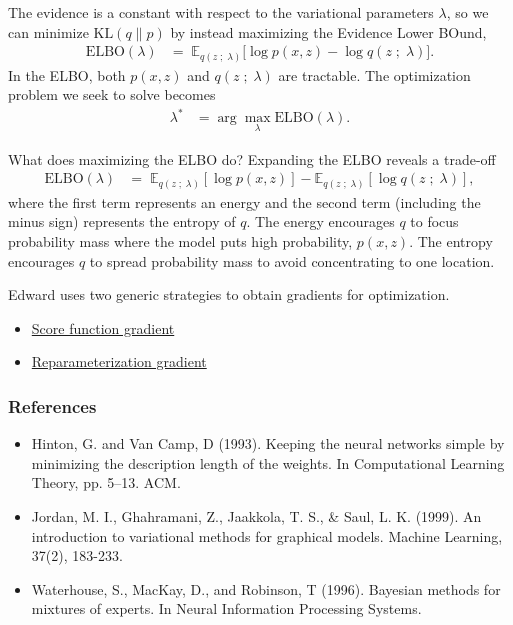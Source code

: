 The evidence is a constant with respect to the variational parameters $\lambda$,
so we can minimize $\text{KL}(q\|p)$ by instead maximizing
the Evidence Lower BOund,
\begin{align*}
  \text{ELBO}(\lambda)
  &=\;
  \mathbb{E}_{q(z\;;\;\lambda)}
  \big[
  \log p(x, z)
  -
  \log q(z\;;\;\lambda)
  \big].
\end{align*}
In the ELBO, both $p(x,z)$ and $q(z\;;\;\lambda)$ are
tractable. The optimization problem we seek to solve becomes
\begin{align*}
  \lambda^*
  &=
  \arg \max_\lambda \text{ELBO}(\lambda).
\end{align*}

What does maximizing the ELBO do? Expanding the ELBO reveals a trade-off
\begin{align*}
  \text{ELBO}(\lambda)
  &=\;
  \mathbb{E}_{q(z \;;\; \lambda)}[\log p(x, z)]
  - \mathbb{E}_{q(z \;;\; \lambda)}[\log q(z\;;\;\lambda)],
\end{align*}
where the first term represents an energy and the second term
(including the minus sign) represents the entropy of $q$.
The energy encourages $q$ to focus probability mass where the
model puts high probability, $p(x, z)$.
The entropy encourages $q$ to spread probability mass to avoid
concentrating to one location.

Edward uses two generic strategies to obtain gradients for
optimization.
\begin{itemize}
    \item \href{tut_KLqp_score.html}{Score function gradient}
    \item \href{tut_KLqp_reparam.html}{Reparameterization gradient}
  \end{itemize}

\subsubsection{References}\label{references}

\begin{itemize}
\item
  Hinton, G. and Van Camp, D (1993). Keeping the neural networks
  simple by minimizing the description length of the weights. In
  Computational Learning Theory, pp. 5–13. ACM.
\item
  Jordan, M. I., Ghahramani, Z., Jaakkola, T. S., & Saul, L. K.
  (1999). An introduction to variational methods for graphical models.
  Machine Learning, 37(2), 183-233.
\item
  Waterhouse, S., MacKay, D., and Robinson, T (1996). Bayesian methods
  for mixtures of experts. In Neural Information Processing Systems.
\end{itemize}
